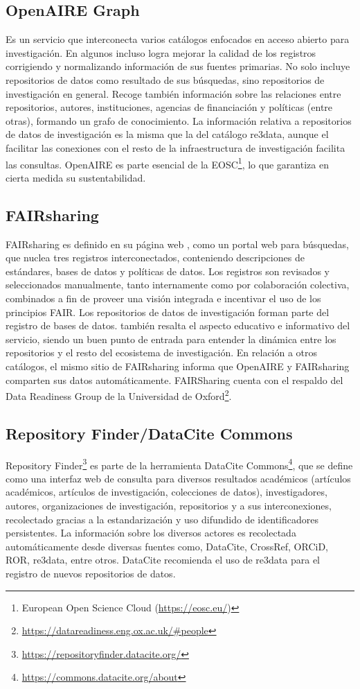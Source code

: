 \documentclass{article}
\begin{document}
\subsection{OpenAIRE Graph}
Es un servicio que interconecta varios catálogos enfocados en acceso abierto para investigación. En algunos incluso logra mejorar la calidad de los registros corrigiendo y normalizando información de sus fuentes primarias.
No solo incluye repositorios de datos como resultado de sus búsquedas, sino repositorios de investigación en general. Recoge también información sobre las relaciones entre repositorios, autores, instituciones, agencias de financiación y políticas (entre otras), formando un grafo de conocimiento.
La información relativa a repositorios de datos de investigación es la misma que la del catálogo re3data, aunque el facilitar las conexiones con el resto de la infraestructura de investigación facilita las consultas.
OpenAIRE es parte esencial de la EOSC\footnote{European Open Science Cloud (\url{https://eosc.eu/})}, lo que garantiza en cierta medida su sustentabilidad.

\subsection{FAIRsharing}
FAIRsharing es definido en su página web \cite{fairsharing2023}, como un portal web para búsquedas, que nuclea tres registros interconectados, conteniendo descripciones de estándares, bases de datos y políticas de datos. 
Los registros son revisados y seleccionados manualmente, tanto internamente como por colaboración colectiva, combinados a fin de proveer una visión integrada e incentivar el uso de los principios FAIR. Los repositorios de datos de investigación forman parte del registro de bases de datos.
\cite{schabinger2023} también resalta el aspecto educativo e informativo del servicio, siendo un buen punto de entrada para entender la dinámica entre los repositorios y el resto del ecosistema de investigación.
En relación a otros catálogos, el mismo sitio de FAIRsharing informa que OpenAIRE y FAIRsharing comparten sus datos automáticamente.
FAIRSharing cuenta con el respaldo del Data Readiness Group de la Universidad de Oxford\footnote{\url{https://datareadiness.eng.ox.ac.uk/\#people}}.

\subsection{Repository Finder/DataCite Commons}
Repository Finder\footnote{\url{https://repositoryfinder.datacite.org/}} es parte de la herramienta DataCite Commons\footnote{\url{https://commons.datacite.org/about}}, que se define como una interfaz web de consulta para diversos resultados académicos (artículos académicos, artículos de investigación, colecciones de datos), investigadores, autores, organizaciones de investigación, repositorios y a sus interconexiones, recolectado gracias a la estandarización y uso difundido de identificadores persistentes. La información sobre los diversos actores es recolectada automáticamente desde diversas fuentes como, DataCite, CrossRef, ORCiD, ROR, re3data, entre otros.
DataCite recomienda el uso de re3data para el registro de nuevos repositorios de datos.
\end{document}
